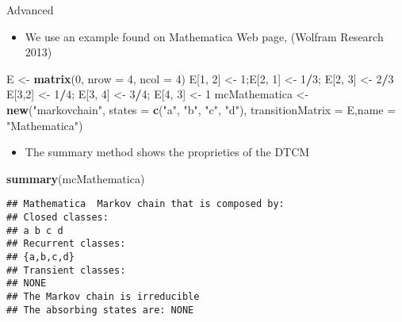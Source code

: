 \documentclass[ignorenonframetext,]{beamer}
\newenvironment{Shaded}{\begin{snugshade}}{\end{snugshade}}
\newcommand{\DataTypeTok}[1]{\textcolor[rgb]{0.13,0.29,0.53}{#1}}
\newcommand{\DecValTok}[1]{\textcolor[rgb]{0.00,0.00,0.81}{#1}}
\newcommand{\KeywordTok}[1]{\textcolor[rgb]{0.13,0.29,0.53}{\textbf{#1}}}
\newcommand{\NormalTok}[1]{#1}
\newcommand{\OperatorTok}[1]{\textcolor[rgb]{0.81,0.36,0.00}{\textbf{#1}}}
\newcommand{\StringTok}[1]{\textcolor[rgb]{0.31,0.60,0.02}{#1}}
\providecommand{\tightlist}{%
  \setlength{\itemsep}{0pt}\setlength{\parskip}{0pt}}
\providecommand{\tightlist}{
  \setlength{\itemsep}{0pt}\setlength{\parskip}{0pt}
}
\begin{document}
\begin{frame}[fragile]

\begin{block}{Advanced}

\begin{itemize}
\tightlist
\item
  We use an example found on Mathematica Web page, (Wolfram Research
  2013)
\end{itemize}

\begin{Shaded}
\begin{Highlighting}[]
\NormalTok{E <-}\StringTok{ }\KeywordTok{matrix}\NormalTok{(}\DecValTok{0}\NormalTok{, }\DataTypeTok{nrow =} \DecValTok{4}\NormalTok{, }\DataTypeTok{ncol =} \DecValTok{4}\NormalTok{)}
\NormalTok{E[}\DecValTok{1}\NormalTok{, }\DecValTok{2}\NormalTok{] <-}\StringTok{ }\DecValTok{1}\NormalTok{;E[}\DecValTok{2}\NormalTok{, }\DecValTok{1}\NormalTok{] <-}\StringTok{ }\DecValTok{1}\OperatorTok{/}\DecValTok{3}\NormalTok{; E[}\DecValTok{2}\NormalTok{, }\DecValTok{3}\NormalTok{] <-}\StringTok{ }\DecValTok{2}\OperatorTok{/}\DecValTok{3}
\NormalTok{E[}\DecValTok{3}\NormalTok{,}\DecValTok{2}\NormalTok{] <-}\StringTok{ }\DecValTok{1}\OperatorTok{/}\DecValTok{4}\NormalTok{; E[}\DecValTok{3}\NormalTok{, }\DecValTok{4}\NormalTok{] <-}\StringTok{ }\DecValTok{3}\OperatorTok{/}\DecValTok{4}\NormalTok{; E[}\DecValTok{4}\NormalTok{, }\DecValTok{3}\NormalTok{] <-}\StringTok{ }\DecValTok{1}
\NormalTok{mcMathematica <-}\StringTok{ }\KeywordTok{new}\NormalTok{(}\StringTok{"markovchain"}\NormalTok{, }\DataTypeTok{states =} \KeywordTok{c}\NormalTok{(}\StringTok{"a"}\NormalTok{, }\StringTok{"b"}\NormalTok{, }\StringTok{"c"}\NormalTok{, }\StringTok{"d"}\NormalTok{),}
                     \DataTypeTok{transitionMatrix =}\NormalTok{ E,}\DataTypeTok{name =} \StringTok{"Mathematica"}\NormalTok{)}
\end{Highlighting}
\end{Shaded}

\end{block}

\end{frame}

\begin{frame}[fragile]

\begin{itemize}
\tightlist
\item
  The summary method shows the proprieties of the DTCM
\end{itemize}

\begin{Shaded}
\begin{Highlighting}[]
\KeywordTok{summary}\NormalTok{(mcMathematica)}
\end{Highlighting}
\end{Shaded}

\begin{verbatim}
## Mathematica  Markov chain that is composed by: 
## Closed classes: 
## a b c d 
## Recurrent classes: 
## {a,b,c,d}
## Transient classes: 
## NONE 
## The Markov chain is irreducible 
## The absorbing states are: NONE
\end{verbatim}

\end{frame}
\end{document}

